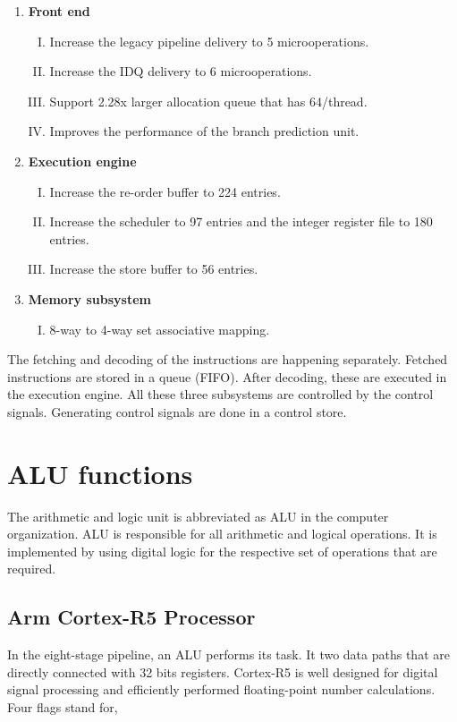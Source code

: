 \documentclass[a4paper,11pt]{article}
\begin{document}
 \begin{enumerate}[\hspace{1cm}1.]
 	\item \textbf{	Front end}
 	\begin{enumerate}[I.]
 		\item  	 Increase the legacy pipeline delivery to 5 microoperations.
 		\item Increase the IDQ delivery to 6 microoperations.
 		\item Support 2.28x larger allocation queue that has 64/thread.
 		\item Improves the performance of the branch prediction unit.
 	\end{enumerate}

 	\item\textbf{	Execution engine}
 	\begin{enumerate}[I.]
 		\item  	 Increase the re-order buffer to 224 entries.
 		\item Increase the scheduler to 97 entries and the integer register file to 180 entries.
 		\item Increase the store buffer to 56 entries.
 	\end{enumerate}

 	\item	\textbf{Memory subsystem}
 	\begin{enumerate}[I.]
 		\item 8-way to 4-way set associative mapping.
 	\end{enumerate}
 \end{enumerate}
The fetching and decoding of the instructions are happening separately. Fetched instructions are stored in a queue (FIFO). After decoding, these are executed in the execution engine. All these three subsystems are controlled by the control signals. Generating control signals are done in a control store.

\section{ALU functions}

The arithmetic and logic unit is abbreviated as ALU in the computer organization. ALU is responsible for all arithmetic and logical operations. It is implemented by using digital logic for the respective set of operations that are required.


\subsection{Arm Cortex-R5 Processor}
In the eight-stage pipeline, an ALU performs its task. It two data paths that are directly connected with 32 bits registers. Cortex-R5 is well designed for digital signal processing and efficiently performed floating-point number calculations. Four flags stand for,
\end{document}
